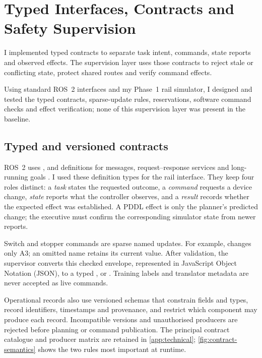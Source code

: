 \chapter[Typed Interfaces, Contracts and Safety Supervision]
{Typed Interfaces, Contracts and\\Safety Supervision}
\label{chap:interfaces}

I implemented typed contracts to separate task intent, commands, state reports
and observed effects. The supervision layer uses those contracts to reject
stale or conflicting state, protect shared routes and verify command effects.

Using standard ROS~2 interfaces and my Phase~1 rail simulator, I designed and
tested the typed contracts, sparse-update rules, reservations, software command
checks and effect verification; none of this supervision layer was present in
the baseline.

\section{Typed and versioned contracts}

ROS~2 uses ,  and  definitions for
messages, request--response services and long-running goals
\citep{ros2jazzyinterfaces}. I used these definition types for the rail
interface. They keep four roles distinct: a
\emph{task} states the requested outcome, a \emph{command} requests a device
change, \emph{state} reports what the controller observes, and a \emph{result}
records whether the expected effect was established. A PDDL effect is only the
planner's predicted change; the executive must confirm the corresponding
simulator state from newer reports.

Switch and stopper commands are sparse named updates. For example,
 changes only A3; an omitted name retains its
current value. After validation, the supervisor converts this checked envelope,
represented in JavaScript Object Notation (JSON), to a typed ,
 or . Training labels and translator
metadata are never accepted as live commands.

Operational records also use versioned schemas that constrain fields and
types, record identifiers, timestamps and provenance, and restrict which
component may produce each record. Incompatible versions and unauthorised
producers are rejected before planning or command publication. The principal
contract catalogue and producer matrix are retained in
\cref{app:technical}; \cref{fig:contract-semantics} shows the two rules most
important at runtime.

